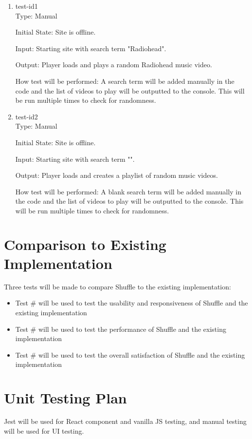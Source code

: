 \documentclass[12pt, titlepage]{article}
\begin{document}
\begin{enumerate}

\item{test-id1\\}
Type: Manual
					
Initial State: Site is offline.
					
Input: Starting site with search term "Radiohead".
					
Output: Player loads and plays a random Radiohead music video.
					
How test will be performed: A search term will be added manually in the code and the list of videos to play will be outputted to the console.  This will be run multiple times to check for randomness.

\item{test-id2\\}
Type: Manual
					
Initial State: Site is offline.
					
Input: Starting site with search term "".
					
Output: Player loads and creates a playlist of random music videos.
					
How test will be performed: A blank search term will be added manually in the code and the list of videos to play will be outputted to the console.  This will be run multiple times to check for randomness.

\end{enumerate}
	
\section{Comparison to Existing Implementation}	
Three tests will be made to compare Shuffle to the existing implementation:
\begin{itemize}
\item Test \# will be used to test the usability and responsiveness of Shuffle and the existing implementation
\item Test \# will be used to test the performance of Shuffle and the existing implementation
\item Test \# will be used to test the overall satisfaction of Shuffle and the existing implementation 
\end{itemize}
\section{Unit Testing Plan}
Jest will be used for React component and vanilla JS testing, and manual testing will be used for UI testing.
		
\end{document}
